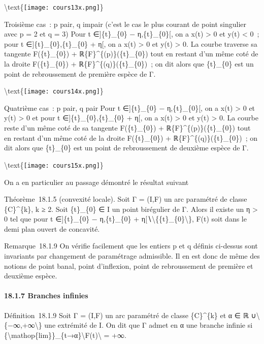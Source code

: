 \documentclass[]{article}
\begin{document}
\textbackslash{}text\{\texttt{[image: cours13x.png]}\}

Troisième cas~: p pair, q impair (c'est le cas le plus courant de point
singulier avec p = 2 et q = 3) Pour t ∈{]}\{t\}\_\{0\} −
η,\{t\}\_\{0\}{[}, on a x(t) \textgreater{} 0 et y(t) \textless{} 0~;
pour t ∈{]}\{t\}\_\{0\},\{t\}\_\{0\} + η{[}, on a x(t) \textgreater{} 0
et y(t) \textgreater{} 0. La courbe traverse sa tangente F(\{t\}\_\{0\})
+ ℝ\{F\}\^{}\{(p)\}(\{t\}\_\{0\}) tout en restant d'un même coté de la
droite F(\{t\}\_\{0\}) + ℝ\{F\}\^{}\{(q)\}(\{t\}\_\{0\})~; on dit alors
que \{t\}\_\{0\} est un point de rebroussement de première espèce de Γ.

\textbackslash{}text\{\texttt{[image: cours14x.png]}\}

Quatrième cas~: p pair, q pair Pour t ∈{]}\{t\}\_\{0\} −
η,\{t\}\_\{0\}{[}, on a x(t) \textgreater{} 0 et y(t) \textgreater{} 0
et pour t ∈{]}\{t\}\_\{0\},\{t\}\_\{0\} + η{[}, on a x(t) \textgreater{}
0 et y(t) \textgreater{} 0. La courbe reste d'un même coté de sa
tangente F(\{t\}\_\{0\}) + ℝ\{F\}\^{}\{(p)\}(\{t\}\_\{0\}) tout en
restant d'un même coté de la droite F(\{t\}\_\{0\}) +
ℝ\{F\}\^{}\{(q)\}(\{t\}\_\{0\})~; on dit alors que \{t\}\_\{0\} est un
point de rebroussement de deuxième espèce de Γ.

\textbackslash{}text\{\texttt{[image: cours15x.png]}\}

On a en particulier au passage démontré le résultat suivant

Théorème~18.1.5 (convexité locale). Soit Γ = (I,F) un arc paramétré de
classe \{C\}\^{}\{k\}, k ≥ 2. Soit \{t\}\_\{0\} ∈ I un point birégulier
de Γ. Alors il existe un η \textgreater{} 0 tel que pour t
∈{]}\{t\}\_\{0\} − η,\{t\}\_\{0\} +
η{[}∖\textbackslash{}\{\{t\}\_\{0\}\textbackslash{}\}, F(t) soit dans le
demi plan ouvert de concavité.

Remarque~18.1.9 On vérifie facilement que les entiers p et q définis
ci-dessus sont invariants par changement de paramétrage admissible. Il
en est donc de même des notions de point banal, point d'inflexion, point
de rebroussement de première et deuxième espèce.

\paragraph{18.1.7 Branches infinies}

Définition~18.1.9 Soit Γ = (I,F) un arc paramétré de classe
\{C\}\^{}\{k\} et α ∈ ℝ ∪\textbackslash{}\{−∞,+∞\textbackslash{}\} une
extrémité de I. On dit que Γ admet en α une branche infinie si
\{\textbackslash{}mathop\{lim\}\}\_\{t→α\}\textbackslash{}\textbar{}F(t)\textbackslash{}\textbar{}
= +∞.
\end{document}
